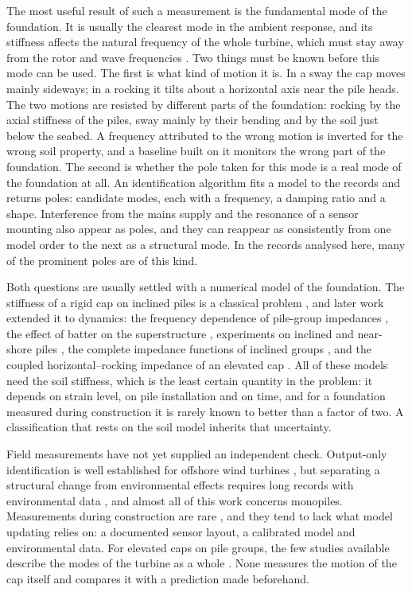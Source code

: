 \documentclass[11pt]{article}
\begin{document}
The most useful result of such a measurement is the fundamental mode of the foundation. It is usually the clearest mode in the ambient response, and its stiffness affects the natural frequency of the whole turbine, which must stay away from the rotor and wave frequencies \cite{arany2017}. Two things must be known before this mode can be used. The first is what kind of motion it is. In a sway the cap moves mainly sideways; in a rocking it tilts about a horizontal axis near the pile heads. The two motions are resisted by different parts of the foundation: rocking by the axial stiffness of the piles, sway mainly by their bending and by the soil just below the seabed. A frequency attributed to the wrong motion is inverted for the wrong soil property, and a baseline built on it monitors the wrong part of the foundation. The second is whether the pole taken for this mode is a real mode of the foundation at all. An identification algorithm fits a model to the records and returns poles: candidate modes, each with a frequency, a damping ratio and a shape. Interference from the mains supply and the resonance of a sensor mounting also appear as poles, and they can reappear as consistently from one model order to the next as a structural mode. In the records analysed here, many of the prominent poles are of this kind.

Both questions are usually settled with a numerical model of the foundation. The stiffness of a rigid cap on inclined piles is a classical problem \cite{hrennikoff1950,saul1968,poulos1980,randolph1978,randolph1979}, and later work extended it to dynamics: the frequency dependence of pile-group impedances \cite{kaynia1982,dobry1988}, the effect of batter on the superstructure \cite{gerolymos2008,carbonari2017}, experiments on inclined and near-shore piles \cite{goit2016,dezi2013}, the complete impedance functions of inclined groups \cite{padron2010,rodriguez2025}, and the coupled horizontal--rocking impedance of an elevated cap \cite{huang2014}. All of these models need the soil stiffness, which is the least certain quantity in the problem: it depends on strain level, on pile installation and on time, and for a foundation measured during construction it is rarely known to better than a factor of two. A classification that rests on the soil model inherits that uncertainty.

Field measurements have not yet supplied an independent check. Output-only identification is well established for offshore wind turbines \cite{devriendt2014,weijtjens2016,noren2021,sastre2024}, but separating a structural change from environmental effects requires long records with environmental data \cite{peeters2001z24}, and almost all of this work concerns monopiles. Measurements during construction are rare \cite{fernandes2022,seo2020}, and they tend to lack what model updating relies on: a documented sensor layout, a calibrated model and environmental data. For elevated caps on pile groups, the few studies available describe the modes of the turbine as a whole \cite{li2022,liu2026,huynh2024}. None measures the motion of the cap itself and compares it with a prediction made beforehand.
\end{document}
